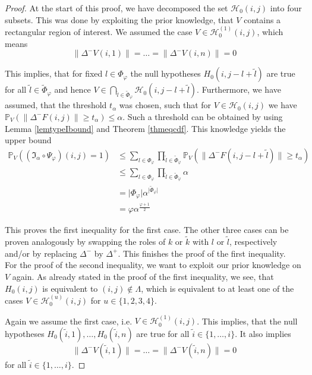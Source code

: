 \documentclass[a4paper,12pt]{article}
\newcommand{\abs}[1]{\lvert#1\rvert}
\newcommand{\norm}[1]{\lVert#1\rVert}
\theoremstyle{plain}
\theoremstyle{definition}
\begin{document}
\begin{proof}
	At the start of this proof, we have decomposed the set $\mathcal{H}_0(i, j)$ into four subsets. This was done by exploiting the prior knowledge, that $V$ contains a rectangular region of interest. We assumed the case $V \in \mathcal{H}_0^{(1)}(i, j)$, which means
	\begin{equation*}
		\norm{\Delta^- V(i, 1)} = \ldots = \norm{\Delta^- V(i, n)} = 0
	\end{equation*}
	
	This implies, that for fixed $l \in \Phi_\varphi$ the null hypotheses $H_0(i, j - l + \tilde{l})$ are true for all $\tilde{l} \in \tilde{\Phi}_\varphi$ and hence $V \in \bigcap_{\tilde{l} \in \tilde{\Phi}_\varphi} \mathcal{H}_0(i, j - l + \tilde{l})$. Furthermore, we have assumed, that the threshold $t_\alpha$ was chosen, such that for $V \in \mathcal{H}_0(i, j)$ we have $\mathbb{P}_V\left( \norm{\Delta^- F(i, j)} \geq t_\alpha \right) \leq \alpha$. Such a threshold can be obtained by using Lemma \ref{lemtypeIbound} and Theorem \ref{thmeqcdf}. This knowledge yields the upper bound
	\begin{align*}
		\mathbb{P}_V( (\mathfrak{I}_\alpha \circ \Psi_\varphi)(i, j) = 1 ) &\leq \sum_{l \in \Phi_\varphi} \prod_{\tilde{l} \in \tilde{\Phi}_\varphi} \mathbb{P}_V\left( \norm{\Delta^- F(i, j - l + \tilde{l})} \geq t_\alpha \right) \\
		&\leq \sum_{l \in \Phi_\varphi} \prod_{\tilde{l} \in \tilde{\Phi}_\varphi} \alpha \\
		&= \abs{\Phi_\varphi} \alpha^{\abs{\tilde{\Phi}_\varphi}} \\
		&= \varphi \alpha^{\frac{\varphi + 1}{2}}
	\end{align*}
	
	This proves the first inequality for the first case. The other three cases can be proven analogously by swapping the roles of $k$ or $\tilde{k}$ with $l$ or $\tilde{l}$, respectively and/or by replacing $\Delta^-$ by $\Delta^+$. This finishes the proof of the first inequality.\\
	
	
	For the proof of the second inequality, we want to exploit our prior knowledge on $V$ again. As already stated in the proof of the first inequality, we see, that $H_0(i, j)$ is equivalent to $(i, j) \notin \varLambda$, which is equivalent to at least one of the cases $V \in \mathcal{H}_0^{(u)}(i, j)$ for $u \in \{ 1, 2, 3, 4 \}$.
	
	Again we assume the first case, i.e. $V \in \mathcal{H}_0^{(1)}(i, j)$. This implies, that the null hypotheses $H_0(\tilde{i}, 1), \ldots, H_0(\tilde{i}, n)$ are true for all $\tilde{i} \in \{ 1, \dots, i \}$. It also implies
	\begin{equation*}
		\norm{\Delta^- V(\tilde{i}, 1)} = \ldots = \norm{\Delta^- V(\tilde{i}, n)} = 0
	\end{equation*}
	for all $\tilde{i} \in \{ 1, \dots, i \}$.
	

\end{proof}
\end{document}
